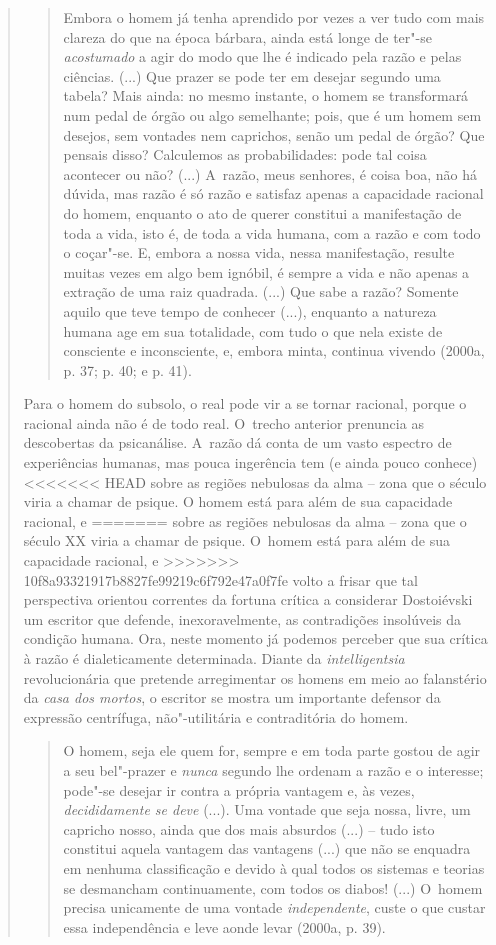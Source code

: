 {\begin{quote}
\begin{quote}
Embora o homem já tenha aprendido por vezes a ver tudo com mais clareza
do que na época bárbara, ainda está longe de ter"-se \emph{acostumado} a
agir do modo que lhe é indicado pela razão e pelas ciências. (...) Que
prazer se pode ter em desejar segundo uma tabela? Mais ainda: no mesmo
instante, o homem se transformará num pedal de órgão ou algo semelhante;
pois, que é um homem sem desejos, sem vontades nem caprichos, senão um
pedal de órgão? Que pensais disso? Calculemos as probabilidades: pode
tal coisa acontecer ou não? (...) A~razão, meus senhores, é coisa boa,
não há dúvida, mas razão é só razão e satisfaz apenas a capacidade
racional do homem, enquanto o ato de querer constitui a manifestação de
toda a vida, isto é, de toda a vida humana, com a razão e com todo o
coçar"-se. E, embora a nossa vida, nessa manifestação, resulte muitas
vezes em algo bem ignóbil, é sempre a vida e não apenas a extração de
uma raiz quadrada. (...) Que sabe a razão? Somente aquilo que teve tempo
de conhecer (...), enquanto a natureza humana age em sua totalidade, com
tudo o que nela existe de consciente e inconsciente, e, embora minta,
continua vivendo (2000a, p. 37; p. 40; e p. 41).
\end{quote}

Para o homem do subsolo, o real pode vir a se tornar racional, porque o
racional ainda não é de todo real. O~trecho anterior prenuncia as
descobertas da psicanálise. A~razão dá conta de um vasto espectro de
experiências humanas, mas pouca ingerência tem (e ainda pouco conhece)
<<<<<<< HEAD
sobre as regiões nebulosas da alma -- zona que o século  viria a
chamar de psique. O homem está para além de sua capacidade racional, e
=======
sobre as regiões nebulosas da alma -- zona que o século XX viria a
chamar de psique. O~homem está para além de sua capacidade racional, e
>>>>>>> 10f8a93321917b8827fe99219c6f792e47a0f7fe
volto a frisar que tal perspectiva orientou correntes da fortuna crítica
a considerar Dostoiévski um escritor que defende, inexoravelmente, as
contradições insolúveis da condição humana. Ora, neste momento já
podemos perceber que sua crítica à razão é dialeticamente determinada.
Diante da \emph{intelligentsia} revolucionária que pretende arregimentar
os homens em meio ao falanstério da \emph{casa dos mortos}, o escritor
se mostra um importante defensor da expressão centrífuga, não"-utilitária
e contraditória do homem.

\begin{quote}
O homem, seja ele quem for, sempre e em toda parte gostou de agir a seu
bel"-prazer e \emph{nunca} segundo lhe ordenam a razão e o interesse;
pode"-se desejar ir contra a própria vantagem e, às vezes,
\emph{decididamente se deve} (...). Uma vontade que seja nossa, livre,
um capricho nosso, ainda que dos mais absurdos (...) -- tudo isto
constitui aquela vantagem das vantagens (...) que não se enquadra em
nenhuma classificação e devido à qual todos os sistemas e teorias se
desmancham continuamente, com todos os diabos! (...) O~homem precisa
unicamente de uma vontade \emph{independente}, custe o que custar essa
independência e leve aonde levar (2000a, p. 39).
\end{quote}


\end{quote}}

